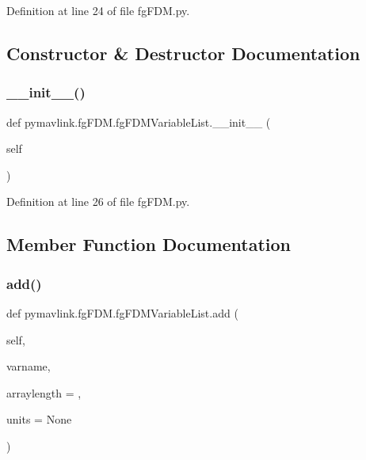 Definition at line 24 of file fg\+F\+D\+M.\+py.



\subsection{Constructor \& Destructor Documentation}
\mbox{\label{classpymavlink_1_1fgFDM_1_1fgFDMVariableList_a99f6215e97c021f81f6b98889e9a1dc6}} 
\subsubsection{\texorpdfstring{\_\_init\_\_()}{\_\_init\_\_()}}
{\footnotesize\ttfamily def pymavlink.\+fg\+F\+D\+M.\+fg\+F\+D\+M\+Variable\+List.\+\_\+\+\_\+init\+\_\+\+\_\+ (\begin{DoxyParamCaption}\item[{}]{self }\end{DoxyParamCaption})}



Definition at line 26 of file fg\+F\+D\+M.\+py.



\subsection{Member Function Documentation}
\mbox{\label{classpymavlink_1_1fgFDM_1_1fgFDMVariableList_a1bc0fcbbced32379e9a56d792e9d9807}} 
\subsubsection{\texorpdfstring{add()}{add()}}
{\footnotesize\ttfamily def pymavlink.\+fg\+F\+D\+M.\+fg\+F\+D\+M\+Variable\+List.\+add (\begin{DoxyParamCaption}\item[{}]{self,  }\item[{}]{varname,  }\item[{}]{arraylength = {},  }\item[{}]{units = {\ttfamily None} }\end{DoxyParamCaption})}



